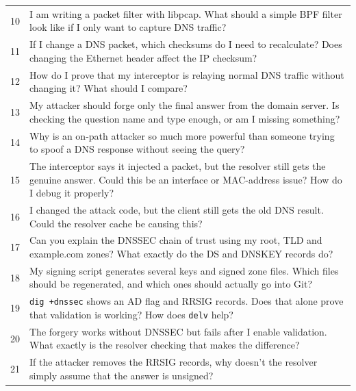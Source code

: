 \documentclass[11pt]{article}
\begin{document}
\begin{longtable}{p{0.8cm}p{12.0cm}}
    10 &
    I am writing a packet filter with libpcap. What should a simple
    BPF filter look like if I only want to capture DNS traffic?\\

    11 &
    If I change a DNS packet, which checksums do I need to recalculate?
    Does changing the Ethernet header affect the IP checksum?\\

    12 &
    How do I prove that my interceptor is relaying normal DNS traffic
    without changing it? What should I compare?\\

    13 &
    My attacker should forge only the final answer from the domain
    server. Is checking the question name and type enough, or am I
    missing something?\\

    14 &
    Why is an on-path attacker so much more powerful than someone
    trying to spoof a DNS response without seeing the query?\\

    15 &
    The interceptor says it injected a packet, but the resolver still
    gets the genuine answer. Could this be an interface or MAC-address
    issue? How do I debug it properly?\\

    16 &
    I changed the attack code, but the client still gets the old DNS
    result. Could the resolver cache be causing this?\\

    17 &
    Can you explain the DNSSEC chain of trust using my root, TLD and
    example.com zones? What exactly do the DS and DNSKEY records do?\\

    18 &
    My signing script generates several keys and signed zone files.
    Which files should be regenerated, and which ones should actually
    go into Git?\\

    19 &
    \texttt{dig +dnssec} shows an AD flag and RRSIG records. Does that
    alone prove that validation is working? How does \texttt{delv} help?\\

    20 &
    The forgery works without DNSSEC but fails after I enable validation.
    What exactly is the resolver checking that makes the difference?\\

    21 &
    If the attacker removes the RRSIG records, why doesn't the resolver
    simply assume that the answer is unsigned?\\


\end{longtable}
\end{document}
